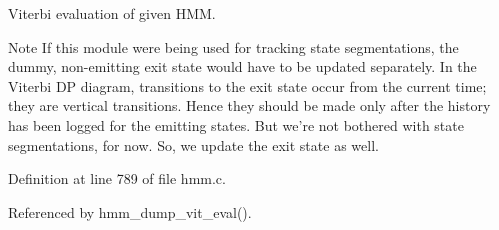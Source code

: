 Viterbi evaluation of given H\-M\-M. 

\begin{DoxyNote}{Note}
If this module were being used for tracking state segmentations, the dummy, non-\/emitting exit state would have to be updated separately. In the Viterbi D\-P diagram, transitions to the exit state occur from the current time; they are vertical transitions. Hence they should be made only after the history has been logged for the emitting states. But we're not bothered with state segmentations, for now. So, we update the exit state as well. 
\end{DoxyNote}


Definition at line 789 of file hmm.\-c.



Referenced by hmm\-\_\-dump\-\_\-vit\-\_\-eval().

